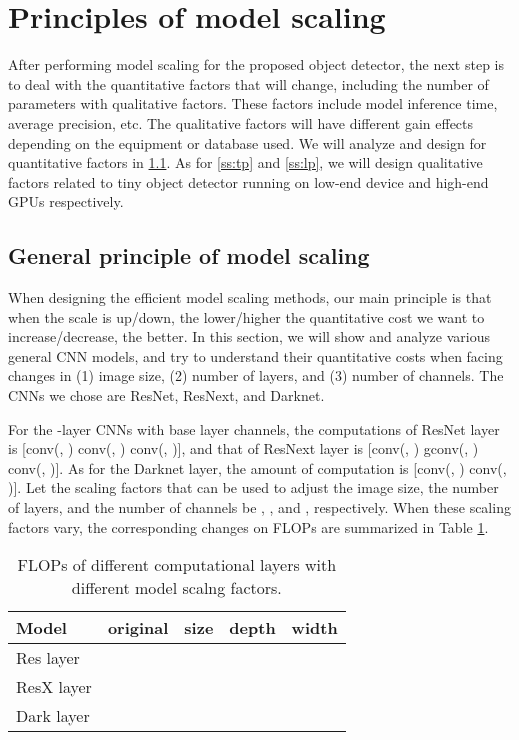 \documentclass[10pt,twocolumn,letterpaper]{article}
\begin{document}
\section{Principles of model scaling}

After performing model scaling for the proposed object detector, the next step is to deal with the quantitative factors that will change, including the number of parameters with qualitative factors.  These factors include model inference time, average precision, etc.  The qualitative factors will have different gain effects depending on the equipment or database used.  We will analyze and design for quantitative factors in \ref{ss:gp}.  As for \ref{ss:tp} and \ref{ss:lp}, we will design qualitative factors related to tiny object detector running on low-end device and high-end GPUs respectively.

\subsection{General principle of model scaling}
\label{ss:gp}

When designing the efficient model scaling methods, our main principle is that when the scale is up/down, the lower/higher the quantitative cost we want to increase/decrease, the better.  In this section, we will show and analyze various general CNN models, and try to understand their quantitative costs when facing changes in (1) image size, (2) number of layers, and (3) number of channels.  The CNNs we chose are ResNet, ResNext, and Darknet.

For the -layer CNNs with  base layer channels, the computations of ResNet layer is [conv(, )  conv(, )  conv(, )], and that of ResNext layer is [conv(, )  gconv(, )  conv(, )].  As for the Darknet layer, the amount of computation is [conv(, )  conv(, )].  Let the scaling factors that can be used to adjust the image size, the number of layers, and the number of channels be , , and , respectively.  When these scaling factors vary, the corresponding changes on FLOPs are summarized in Table \ref{table:t1}.

\begin{table}[h]
	\centering
	\begin{threeparttable}[h]
		\footnotesize
		\caption{FLOPs of different computational layers with different model scalng factors.}
		\label{table:t1}
		\setlength\tabcolsep{3.5pt}
		\begin{tabular}{llccc}
			\toprule
			\textbf{Model} & \textbf{original} & \textbf{size } & \textbf{depth } & \textbf{width } \\			
			\midrule
			Res layer &  &  &  &  \\
			ResX layer &  &  &  &  \\
			Dark layer &  &  &  &  \\
			\bottomrule
		\end{tabular}
	\end{threeparttable}
\end{table}
\end{document}
